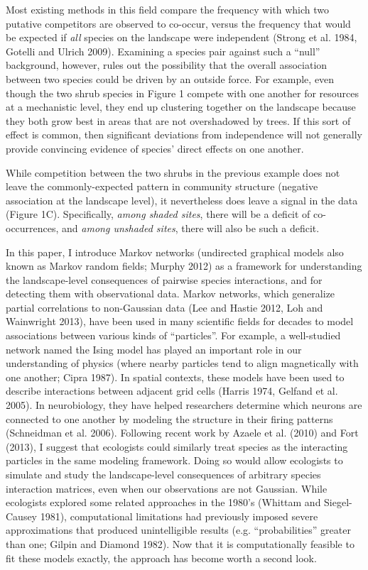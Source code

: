 \documentclass[12pt,]{article}
\begin{document}
\begin{spacing}{1.9}
\begin{flushleft}
Most existing methods in this field compare the frequency with which two
putative competitors are observed to co-occur, versus the frequency that
would be expected if \emph{all} species on the landscape were
independent (Strong et al. 1984, Gotelli and Ulrich 2009). Examining a
species pair against such a ``null'' background, however, rules out the
possibility that the overall association between two species could be
driven by an outside force. For example, even though the two shrub
species in Figure 1 compete with one another for resources at a
mechanistic level, they end up clustering together on the landscape
because they both grow best in areas that are not overshadowed by trees.
If this sort of effect is common, then significant deviations from
independence will not generally provide convincing evidence of species'
direct effects on one another.

While competition between the two shrubs in the previous example does
not leave the commonly-expected pattern in community structure (negative
association at the landscape level), it nevertheless does leave a signal
in the data (Figure 1C). Specifically, \emph{among shaded sites}, there
will be a deficit of co-occurrences, and \emph{among unshaded sites},
there will also be such a deficit.

In this paper, I introduce Markov networks (undirected graphical models
also known as Markov random fields; Murphy 2012) as a framework for
understanding the landscape-level consequences of pairwise species
interactions, and for detecting them with observational data. Markov
networks, which generalize partial correlations to non-Gaussian data
(Lee and Hastie 2012, Loh and Wainwright 2013), have been used in many
scientific fields for decades to model associations between various
kinds of ``particles''. For example, a well-studied network named the
Ising model has played an important role in our understanding of physics
(where nearby particles tend to align magnetically with one another;
Cipra 1987). In spatial contexts, these models have been used to
describe interactions between adjacent grid cells (Harris 1974, Gelfand
et al. 2005). In neurobiology, they have helped researchers determine
which neurons are connected to one another by modeling the structure in
their firing patterns (Schneidman et al. 2006). Following recent work by
Azaele et al. (2010) and Fort (2013), I suggest that ecologists could
similarly treat species as the interacting particles in the same
modeling framework. Doing so would allow ecologists to simulate and
study the landscape-level consequences of arbitrary species interaction
matrices, even when our observations are not Gaussian. While ecologists
explored some related approaches in the 1980's (Whittam and
Siegel-Causey 1981), computational limitations had previously imposed
severe approximations that produced unintelligible results (e.g.
``probabilities'' greater than one; Gilpin and Diamond 1982). Now that
it is computationally feasible to fit these models exactly, the approach
has become worth a second look.


\end{flushleft}
\end{spacing}
\end{document}
